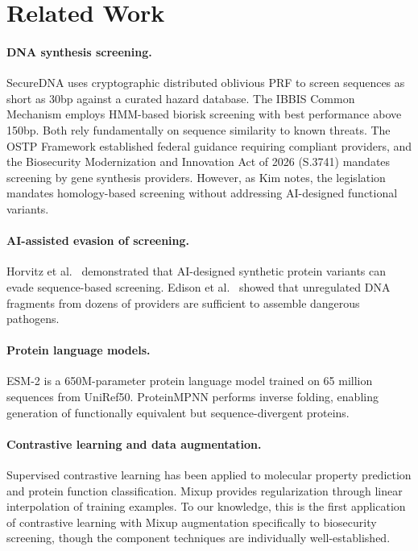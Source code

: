 \documentclass[11pt,a4paper]{article}
\begin{document}
\section{Related Work}

\paragraph{DNA synthesis screening.}
SecureDNA \cite{securedna2024} uses cryptographic distributed oblivious PRF to screen sequences as short as 30bp against a curated hazard database. The IBBIS Common Mechanism \cite{ibbis2024} employs HMM-based biorisk screening with best performance above 150bp. Both rely fundamentally on sequence similarity to known threats. The OSTP Framework \cite{ostp2024} established federal guidance requiring compliant providers, and the Biosecurity Modernization and Innovation Act of 2026 (S.3741) mandates screening by gene synthesis providers. However, as Kim \cite{kim2026ai} notes, the legislation mandates homology-based screening without addressing AI-designed functional variants.

\paragraph{AI-assisted evasion of screening.}
Horvitz et al.\ \cite{horvitz2025strengthening} demonstrated that AI-designed synthetic protein variants can evade sequence-based screening. Edison et al.\ \cite{edison2026assembling} showed that unregulated DNA fragments from dozens of providers are sufficient to assemble dangerous pathogens.

\paragraph{Protein language models.}
ESM-2 \cite{lin2023evolutionary} is a 650M-parameter protein language model trained on 65 million sequences from UniRef50. ProteinMPNN \cite{dauparas2022robust} performs inverse folding, enabling generation of functionally equivalent but sequence-divergent proteins.

\paragraph{Contrastive learning and data augmentation.}
Supervised contrastive learning \cite{khosla2020supervised} has been applied to molecular property prediction and protein function classification. Mixup \cite{zhang2018mixup} provides regularization through linear interpolation of training examples. To our knowledge, this is the first application of contrastive learning with Mixup augmentation specifically to biosecurity screening, though the component techniques are individually well-established.
\end{document}
